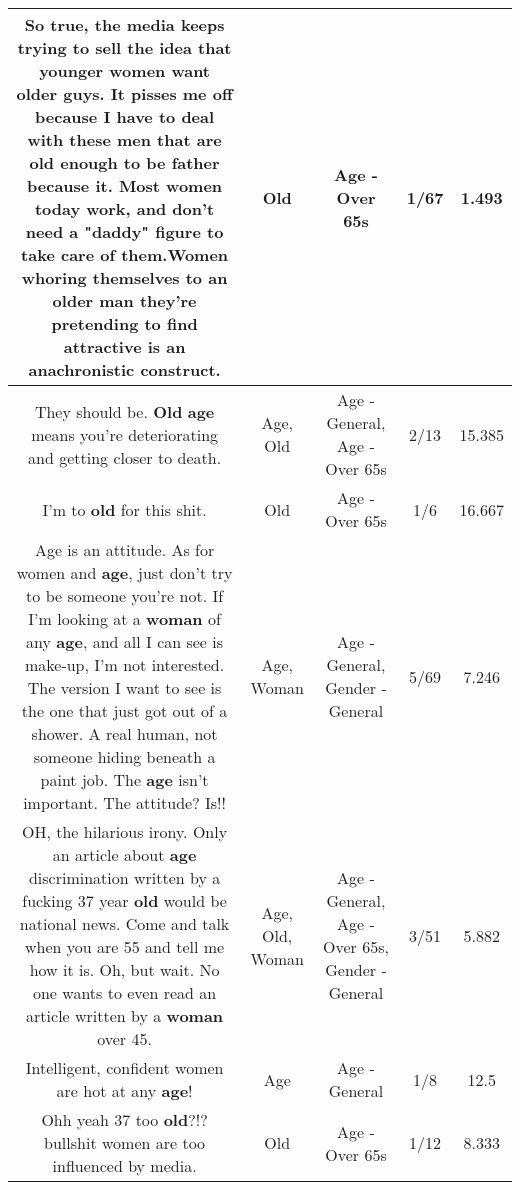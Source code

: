 \documentclass[11pt]{article}
\newlength\mylength
\begin{document}
\begin{center}
\begin{longtable}{|C{.65\mylength}|C{.30\mylength}|C{.12\mylength}|C{.12\mylength}|C{.12\mylength}|}
  \small So true, the media keeps trying to sell the idea that younger women want older guys. It pisses me off because I have to deal with these men that are \textbf{old} enough to be father because it. Most women today work, and don't need a "daddy" figure to take care of them.Women whoring themselves to an older man they're pretending to find attractive is an anachronistic construct.\normalsize   & Old & Age - Over 65s & 1/67 & 1.493 \\  \hline
  \small They should be. \textbf{Old} \textbf{age} means you're deteriorating and getting closer to death.\normalsize   & Age, Old & Age - General, Age - Over 65s & 2/13 & 15.385 \\  \hline
  \small I'm to \textbf{old} for this shit.\normalsize   & Old & Age - Over 65s & 1/6 & 16.667 \\  \hline
  \small Age is an attitude. As for women and \textbf{age}, just don't try to be someone you're not. If I'm looking at a \textbf{woman} of any \textbf{age}, and all I can see is make-up, I'm not interested. The version I want to see is the one that just got out of a shower. A real human, not someone hiding beneath a paint job. The \textbf{age} isn't important. The attitude? Is!!\normalsize   & Age, Woman & Age - General, Gender - General & 5/69 & 7.246 \\  \hline
  \small OH, the hilarious irony. Only an article about \textbf{age} discrimination written by a fucking 37 year \textbf{old} would be national news.  Come and talk when you are 55 and tell me how it is.  Oh, but wait.  No one wants to even read an article written by a \textbf{woman} over 45.\normalsize   & Age, Old, Woman & Age - General, Age - Over 65s, Gender - General & 3/51 & 5.882 \\  \hline
  \small Intelligent, confident women are hot at any \textbf{age}!\normalsize   & Age & Age - General & 1/8 & 12.5 \\  \hline
  \small Ohh yeah 37 too \textbf{old}?!? bullshit women are too influenced by media.\normalsize   & Old & Age - Over 65s & 1/12 & 8.333 \\  \hline

\end{longtable}
\end{center}
\end{document}

